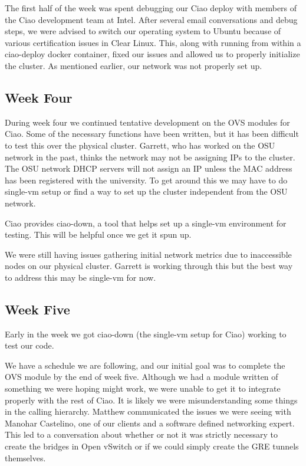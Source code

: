\documentclass[10pt,onecolumn,journal,draftclsnofoot]{IEEEtran}
\begin{document}
The first half of the week was spent debugging our Ciao deploy with members of
the Ciao development team at Intel. After several email conversations and debug
steps, we were advised to switch our operating system to Ubuntu because of
various certification issues in Clear Linux. This, along with running from
within a ciao-deploy docker container, fixed our issues and allowed us to
properly initialize the cluster. As mentioned earlier, our network was not
properly set up.

\subsection{Week Four}

During week four we continued tentative development on the OVS modules for Ciao.
Some of the necessary functions have been written, but it has been difficult to
test this over the physical cluster. Garrett, who has worked on the OSU network
in the past, thinks the network may not be assigning IPs to the cluster. The OSU
network DHCP servers will not assign an IP unless the MAC address has been
registered with the university. To get around this we may have to do single-vm
setup or find a way to set up the cluster independent from the OSU network.

Ciao provides ciao-down, a tool that helps set up a single-vm environment for
testing. This will be helpful once we get it spun up.

We were still having issues gathering initial network metrics due to
inaccessible nodes on our physical cluster. Garrett is working through this but
the best way to address this may be single-vm for now.

\subsection{Week Five}

Early in the week we got ciao-down (the single-vm setup for Ciao) working to
test our code.

We have a schedule we are following, and our initial goal was to complete the
OVS module by the end of week five. Although we had a module written of
something we were hoping might work, we were unable to get it to integrate
properly with the rest of Ciao.  It is likely we were misunderstanding some
things in the calling hierarchy.  Matthew communicated the issues we were seeing
with Manohar Castelino, one of our clients and a software defined networking
expert. This led to a conversation about whether or not it was strictly
necessary to create the bridges in Open vSwitch or if we could simply create the
GRE tunnels themselves.
\end{document}
